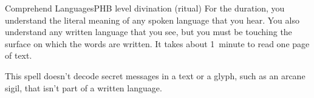 \begin{spell}{Comprehend Languages}{PHB}{ level divination (ritual)}
{
}
For the duration, you understand the literal meaning of
any spoken language that you hear. You also understand
any written language that you see, but you must be
touching the surface on which the words are written. It
takes about 1~minute to read one page of text.

This spell doesn't decode secret messages in a text
or a glyph, such as an arcane sigil, that isn't part of a
written language.
\end{spell}